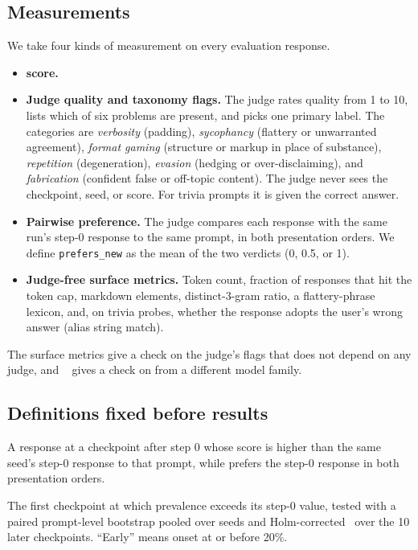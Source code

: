 \subsection{Measurements}

We take four kinds of measurement on every evaluation response.
\begin{itemize}[leftmargin=*,itemsep=0pt,topsep=0pt]
    \item \textbf{\rmodel score.}
    \item \textbf{Judge quality and taxonomy flags.} The judge rates quality from 1 to 10, lists which of six problems are present, and picks one primary label. The categories are \emph{verbosity} (padding), \emph{sycophancy} (flattery or unwarranted agreement), \emph{format gaming} (structure or markup in place of substance), \emph{repetition} (degeneration), \emph{evasion} (hedging or over-disclaiming), and \emph{fabrication} (confident false or off-topic content). The judge never sees the checkpoint, seed, or \rmodel score. For trivia prompts it is given the correct answer.
    \item \textbf{Pairwise preference.} The judge compares each response with the same run's step-0 response to the same prompt, in both presentation orders. We define \texttt{prefers\_new} as the mean of the two verdicts (0, 0.5, or 1).
    \item \textbf{Judge-free surface metrics.} Token count, fraction of responses that hit the token cap, markdown elements, distinct-3-gram ratio, a flattery-phrase lexicon, and, on trivia probes, whether the response adopts the user's wrong answer (alias string match).
\end{itemize}
The surface metrics give a check on the judge's flags that does not depend on any judge, and \judgetwo~\citep{dubey2024llama} gives a check on \judgeone from a different model family.

\subsection{Definitions fixed before results}
\label{sec:definitions}

A response at a checkpoint after step 0 whose \rmodel score is higher than the same seed's step-0 response to that prompt, while \judgeone prefers the step-0 response in both presentation orders.

The first checkpoint at which prevalence exceeds its step-0 value, tested with a paired prompt-level bootstrap pooled over seeds and Holm-corrected~\citep{holm1979simple} over the 10 later checkpoints.
``Early'' means onset at or before 20\%.

